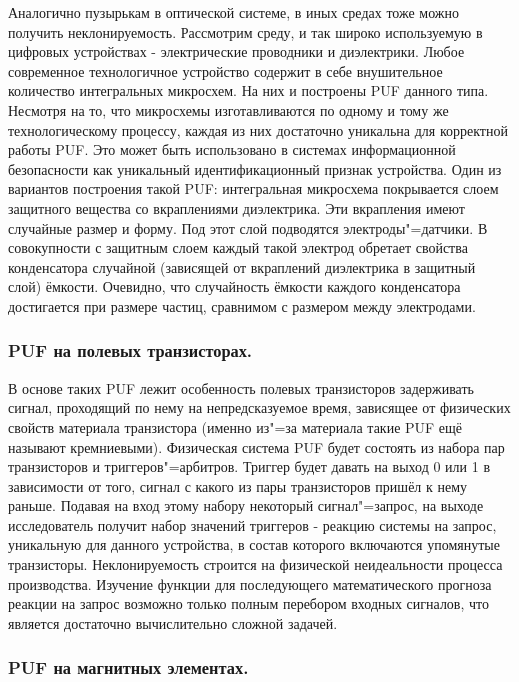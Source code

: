 Аналогично пузырькам в оптической системе, в иных средах тоже можно получить неклонируемость. Рассмотрим среду, и так широко используемую в цифровых устройствах - электрические проводники и диэлектрики.
Любое современное технологичное устройство содержит в себе внушительное количество интегральных микросхем. На них и построены PUF данного типа. Несмотря на то, что микросхемы изготавливаются по одному и тому же технологическому процессу, каждая из них достаточно уникальна для корректной работы PUF. Это может быть использовано в системах информационной безопасности как уникальный идентификационный признак устройства.
Один из вариантов построения такой PUF: интегральная микросхема покрывается слоем защитного вещества со вкраплениями диэлектрика. Эти вкрапления имеют случайные размер и форму. Под этот слой подводятся электроды"=датчики. В совокупности с защитным слоем каждый такой электрод обретает свойства конденсатора случайной (зависящей от вкраплений диэлектрика в защитный слой) ёмкости. Очевидно, что случайность ёмкости каждого конденсатора достигается при размере частиц, сравнимом с размером между электродами.


\subsubsection{PUF на полевых транзисторах. }
\label{sub:domain:puf_physical_types:transistors}

В основе таких PUF лежит особенность полевых транзисторов задерживать сигнал, проходящий по нему на непредсказуемое время, зависящее от физических свойств материала транзистора (именно из"=за материала такие PUF ещё называют кремниевыми). Физическая система PUF будет состоять из набора пар транзисторов и триггеров"=арбитров. Триггер будет давать на выход 0 или 1 в зависимости от того, сигнал с какого из пары транзисторов пришёл к нему раньше. Подавая на вход этому набору некоторый сигнал"=запрос, на выходе исследователь получит набор значений триггеров - реакцию системы на запрос, уникальную для данного устройства, в состав которого включаются упомянутые транзисторы. Неклонируемость строится на физической неидеальности процесса производства. Изучение функции для последующего математического прогноза реакции на запрос возможно только полным перебором входных сигналов, что является достаточно вычислительно сложной задачей.


\subsubsection{PUF на магнитных элементах. }
\label{sub:domain:puf_physical_types:magnetic}

